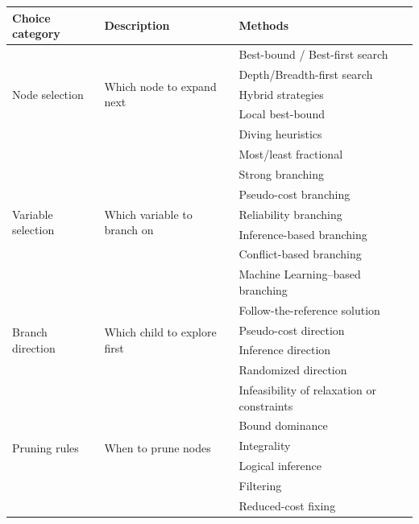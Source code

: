 \begin{table}[H]
    \centering
    \begin{tabular}{l|l|l}
        \textbf{Choice category} & \textbf{Description} & \textbf{Methods} \\
        \hline
        \multirow{5}{*}{Node selection} & \multirow{5}{*}{Which node to expand next} 
        &  Best-bound / Best-first search \cite{land_automatic_1960} \\
        & & Depth/Breadth-first search \cite{golomb_backtrack_1965,moore_shortest_1959} \\
        & & Hybrid strategies \cite{achterberg_branching_2005,van_hoeve_hybrid_2009} \\
        & & Local best-bound \\
        & & Diving heuristics \cite{achterberg_constraint_2007} \\
        \hline
        \multirow{7}{*}{Variable selection} & \multirow{7}{*}{Which variable to branch on} 
        & Most/least fractional \cite{driebeek_algorithm_1966} \\
        & & Strong branching \\
        & & Pseudo-cost branching \\
        & & Reliability branching \\
        & & Inference-based branching \\
        & & Conflict-based branching \\
        & & Machine Learning–based branching \\ 
        \hline
        \multirow{4}{*}{Branch direction}   & \multirow{4}{*}{Which child to explore first} 
        & Follow-the-reference solution \\
        & & Pseudo-cost direction \\
        & & Inference direction \\
        & & Randomized direction\\ 
        \hline
        \multirow{6}{*}{Pruning rules}      & \multirow{6}{*}{When to prune nodes} 
        & Infeasibility of relaxation or constraints \\
        & & Bound dominance \\
        & & Integrality \\
        & & Logical inference \\
        & & Filtering \\
        & & Reduced-cost fixing\\ 
        \hline

\end{tabular}
\end{table}

